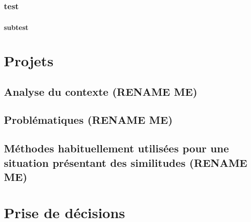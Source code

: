 \documentclass[12pt,a4paper,article]{memoir} %
\begin{document}
\subsection{test}

\paragraph{} \lipsum

\subsubsection{subtest}

\paragraph{} \lipsum

\newpage
\chapter{Projets}

\section{Analyse du contexte (RENAME ME) }

\paragraph{} \lipsum

\section{Problématiques (RENAME ME) }

\paragraph{} \lipsum

\section{Méthodes habituellement utilisées pour une situation présentant des similitudes (RENAME ME) }

\paragraph{} \lipsum

\newpage
\chapter{Prise de décisions}
\end{document}
